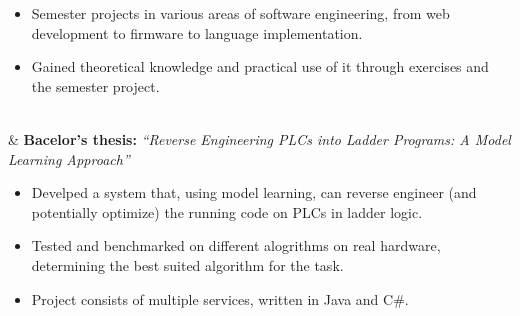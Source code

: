 \documentclass[a4paper]{report}
\begin{document}
\begin{longtabu}
\begin{itemize}[leftmargin=2em, topsep=-.5em, parsep=0em]
        \item Semester projects in various areas of software engineering, from web development to firmware to language implementation.
        \item Gained theoretical knowledge and practical use of it through exercises and the semester project.
    \end{itemize}
    \vspace{-.1em}
    \\
        &  \textbf{Bacelor's thesis:} \textit{``Reverse Engineering PLCs into Ladder Programs: A Model Learning Approach''}
        \begin{itemize}[leftmargin=2em, topsep=-.5em,  parsep=0em]
            \item Develped a system that, using model learning, can reverse engineer (and potentially optimize) the running code on PLCs in ladder logic.
            \item Tested and benchmarked on different alogrithms on real hardware, determining the best suited algorithm for the task.
            \item Project consists of multiple services, written in Java and C\#.
        \end{itemize}
\end{longtabu}

\pagebreak
\end{document}
